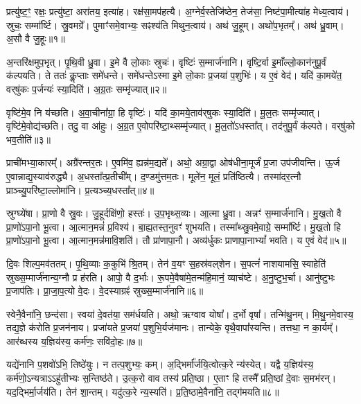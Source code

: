 प्रत्यु॑ष्ट॒ꣳ॒ रक्षः॒ प्रत्यु॑ष्टा॒ अरा॑तय॒ इत्या॑ह।
रक्ष॑सा॒मप॑हत्यै।
अ॒ग्नेर्व॒स्तेजि॑ष्ठेन॒ तेज॑सा॒ निष्ट॑पा॒मीत्या॑ह मेध्य॒त्वाय॑।
स्रुचः॒ सम्मा᳚र्ष्टि।
स्रु॒वमग्रे᳚।
पुमाꣳ॑समे॒वाभ्यः॒ सꣴश्य॑ति मिथुन॒त्वाय॑।
अथ॑ जु॒हूम्।
अथो॑प॒भृतम्᳚।
अथ॑ ध्रु॒वाम्।
अ॒सौ वै जु॒हूः॥१॥

अ॒न्तरि॑क्षमुप॒भृत्।
पृ॒थि॒वी ध्रु॒वा।
इ॒मे वै लो॒काः स्रुचः॑।
वृष्टिः॑ स॒म्मार्ज॑नानि।
वृष्टि॒र्वा इ॒माँल्लो॒कान॑नुपू॒र्वं क॑ल्पयति।
ते ततः॑ कॢ॒प्ताः समे॑धन्ते।
समे॑धन्ते\-ऽस्मा इ॒मे लो॒काः प्र॒जया॑ प॒शुभिः॑।
य ए॒वं वेद॑।
यदि॑ का॒मये॑त॒ वर्‌\mbox{}षु॑कः प॒र्जन्यः॑ स्या॒दिति॑।
अ॒ग्र॒तः सम्मृ॑ज्यात्॥२॥

वृष्टि॑मे॒व नि य॑च्छति।
अ॒वा॒चीना᳚ग्रा॒ हि वृष्टिः॑।
यदि॑ का॒मये॒ताव॑र्‌\mbox{}षुकः स्या॒दिति॑।
मू॒ल॒तः सम्मृ॑ज्यात्।
वृष्टि॑मे॒वोद्य॑च्छति।
तदु॒ वा आ॑हुः।
अ॒ग्र॒त ए॒वोपरि॑ष्टा॒थ्सम्मृ॑\-ज्यात्।
मू॒ल॒तो॑\-ऽधस्ता᳚त्।
तद॑नुपू॒र्वं क॑ल्पते।
वर्‌\mbox{}षु॑को भव॒तीति॑॥३॥

प्राची॑मभ्या॒कारम्᳚।
अग्रै॑रन्तर॒तः।
ए॒वमि॑व॒ ह्यन्न॑म॒द्यते᳚।
अथो॒ अग्रा॒द्वा ओष॑धीना॒मूर्जं॑ प्र॒जा उप॑जीवन्ति।
ऊ॒र्ज ए॒वान्नाद्य॒स्याव॑रुद्ध्यै।
अ॒धस्ता᳚त्प्र॒तीची᳚म्।
द॒ण्डमु॑त्तम॒तः।
मूले॑न॒ मूलं॒ प्रति॑\-ष्ठित्यै।
तस्मा॑दर॒त्नौ प्राञ्च्यु॒परि॑ष्टा॒ल्लोमा॑नि।
प्र॒त्यञ्च्य॒धस्ता᳚त्॥४॥

स्रुग्घ्ये॑षा।
प्रा॒णो वै स्रु॒वः।
जु॒हूर्दक्षि॑णो॒ हस्तः॑।
उ॒प॒भृथ्स॒व्यः।
आ॒त्मा ध्रु॒वा।
अन्नꣳ॑ स॒म्मार्ज॑नानि।
मु॒ख॒तो वै प्रा॒णो॑\-ऽपा॒नो भू॒त्वा।
आ॒त्मान॒मन्नं॑ प्र॒विश्य॑।
बा॒ह्य॒तस्त॒नुवꣳ॑ शुभयति।
तस्मा᳚थ्स्रु॒वमे॒वाग्रे॒ सम्मा᳚र्ष्टि।
मु॒ख॒तो हि प्रा॒णो॑\-ऽपा॒नो भू॒त्वा।
आ॒त्मान॒मन्न॑मावि॒शति॑।
तौ प्रा॑णापा॒नौ।
अव्य॑र्धुकः प्राणापा॒नाभ्यां᳚ भवति।
य ए॒वं वेद॑॥५॥\anuvakamend[जु॒हूर्मृ॑ज्याद्भव॒तीति॑ प्र॒त्यञ्च्य॒धस्ता᳚न्मार्ष्टि॒ पञ्च॑ च]

दि॒वः शिल्प॒मव॑ततम्।
पृ॒थि॒व्याः क॒कुभि॑ श्रि॒तम्।
तेन॑ व॒यꣳ स॒हस्र॑वल्‌शेन।
स॒पत्नं॑ नाशयामसि॒ स्वाहेति॑ स्रुख्स॒म्मार्ज॑नान्य॒ग्नौ प्र ह॑रति।
आपो॒ वै द॒र्भाः।
रू॒पमे॒वैषा॑मे॒तन्म॑हि॒मानं॒ व्याच॑ष्टे।
अ॒नु॒ष्टुभ॒र्चा।
आनु॑ष्टुभः प्र॒जा\-प॑तिः।
प्रा॒जा॒प॒त्यो वे॒दः।
वे॒दस्याग्रꣴ॑ स्रुख्स॒म्मार्ज॑नानि॥६॥

स्वेनै॒वैना॑नि॒ छन्द॑सा।
स्वया॑ दे॒वत॑या॒ सम॑र्धयति।
अथो॒ ऋग्वाव योषा᳚।
द॒र्भो वृषा᳚।
तन्मि॑थु॒नम्।
मि॒थु॒नमे॒वास्य॒ तद्य॒ज्ञे क॑रोति प्र॒जन॑नाय।
प्रजा॑यते प्र॒जया॑ प॒शुभि॒र्यज॑मानः।
तान्येके॒ वृथै॒वापा᳚स्यन्ति।
तत्तथा॒ न का॒र्यम्᳚।
आर॑ब्धस्य य॒ज्ञिय॑स्य॒ कर्म॑णः॒ सवि॑दो॒हः॥७॥

यद्ये॑नानि प॒शवो॑ऽभि॒ तिष्ठे॑युः।
न तत्प॒शुभ्यः॒ कम्।
अ॒द्भिर्मा᳚र्जयि॒त्वोत्क॒रे न्य॑स्येत्।
यद्वै य॒ज्ञिय॑स्य॒ कर्म॑णो॒\-ऽन्यत्राऽऽहु॑तीभ्यः स॒न्तिष्ठ॑ते।
उ॒त्क॒रो वाव तस्य॑ प्रति॒ष्ठा।
ए॒ताꣳ हि तस्मै᳚ प्रति॒ष्ठां दे॒वाः स॒मभ॑रन्।
यद॒द्भिर्मा॒र्जय॑ति।
तेन॑ शा॒न्तम्।
यदु॑त्क॒रे न्य॒स्यति॑।
प्र॒ति॒ष्ठामे॒वैना॑नि॒ तद्ग॑मयति॥८॥

